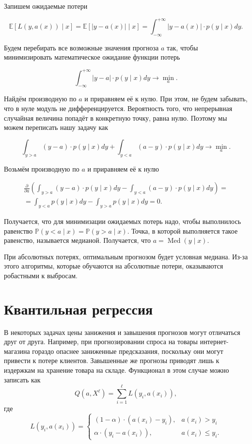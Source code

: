 \documentclass[12pt,a4paper]{article}
\DeclareMathOperator{\Med}{Med}
\begin{document}
\begin{esSolution}
Запишем ожидаемые потери

\[
\mathbb{E}\left[L(y, a(x)) \mid x \right] = \mathbb{E} \left[ |y - a(x)| \mid x \right] = \int_{-\infty}^{+\infty} |y - a(x)| \cdot p(y \mid x) dy.
\]

Будем перебирать все возможные значения прогноза $a$ так, чтобы минимизировать математическое ожидание функции потерь

\[
\int_{-\infty}^{+\infty} |y - a| \cdot p(y \mid x) dy \to \min_{a}.
\]

Найдём производную по $a$ и приравняем её к нулю. При этом, не будем забывать, что в нуле модуль не дифференцируется. Вероятность того, что непрерывная случайная величина попадёт в конкретную точку, равна нулю. Поэтому мы можем переписать нашу задачу как 

\[
\int_{y > a} (y - a) \cdot p(y \mid x) dy + \int_{y < a} (a - y) \cdot p(y \mid x) dy \to \min_{a}.
\]

Возьмём производную по $a$ и приравняем её к нулю 

\begin{multline*}
\frac{\partial }{\partial a} \left( \int_{y > a} (y - a) \cdot p(y \mid x) dy - \int_{y < a} (a - y) \cdot p(y \mid x) dy  \right) = \\
= \int_{y < a} p(y \mid x) dy - \int_{y > a} p(y \mid x) dy = 0.
\end{multline*}

Получается, что для минимизации ожидаемых потерь надо, чтобы выполнилось равенство $\mathbb{P}(y < a \mid x) = \mathbb{P}(y > a \mid x).$ Точка, в которой выполняется такое равенство, называется медианой. Получается, что $a = \Med(y \mid x)$. 

При абсолютных потерях, оптимальным прогнозом будет условная медиана. Из-за этого алгоритмы, которые обучаются на абсолютные потери, оказываются робастными к выбросам.
\end{esSolution}	    

\section{Квантильная регрессия}

В некоторых задачах цены занижения и завышения прогнозов могут отличаться друг от друга.
Например, при прогнозировании спроса на товары интернет-магазина гораздо опаснее заниженные
предсказания, поскольку они могут привести к потере клиентов.
Завышенные же прогнозы приводят лишь к издержкам на хранение товара на складе.
Функционал в этом случае можно записать как
\[
    Q(a, X^\ell)
    =
    \sum_{i = 1}^{\ell} L(y_i, a(x_i))
        ,
\]
где
\[
    L(y_i, a(x_i)) = \begin{cases} (1 - \alpha) \cdot (a(x_i) - y_i), &a(x_i) > y_i \\  \alpha \cdot ( y_i - a(x_i)), &a(x_i) \le y_i.  \end{cases}
\]
\end{document}
